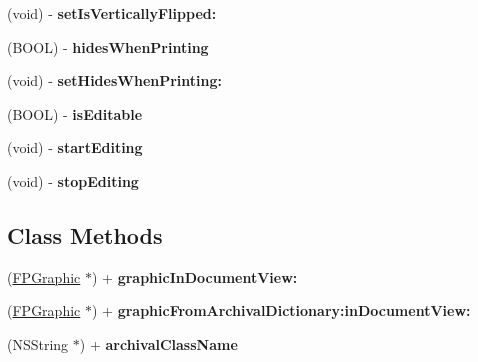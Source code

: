 \begin{DoxyCompactItemize}
(void) -\/ {\bfseries set\+Is\+Vertically\+Flipped\+:}
\item 
\mbox{\label{interface_f_p_graphic_a4898d86b37bb533fb8aac374c2e73dce}} 
(B\+O\+OL) -\/ {\bfseries hides\+When\+Printing}
\item 
\mbox{\label{interface_f_p_graphic_a8759b7bf35008b903003a63e1313969a}} 
(void) -\/ {\bfseries set\+Hides\+When\+Printing\+:}
\item 
\mbox{\label{interface_f_p_graphic_ab1b4e0d79e895be378550e712bc78a33}} 
(B\+O\+OL) -\/ {\bfseries is\+Editable}
\item 
\mbox{\label{interface_f_p_graphic_a82be1dce82ba693bcd3060450c033a0b}} 
(void) -\/ {\bfseries start\+Editing}
\item 
\mbox{\label{interface_f_p_graphic_a49d581d14a8dc848dcd489e93501debb}} 
(void) -\/ {\bfseries stop\+Editing}
\end{DoxyCompactItemize}
\subsection*{Class Methods}
\begin{DoxyCompactItemize}
\item 
\mbox{\label{interface_f_p_graphic_ac75de5a01d490f056fa52ee47eb2bbb0}} 
(\mbox{\hyperlink{interface_f_p_graphic}{F\+P\+Graphic}} $\ast$) + {\bfseries graphic\+In\+Document\+View\+:}
\item 
\mbox{\label{interface_f_p_graphic_a76cfd956ce13caf8f32cafbd166ece29}} 
(\mbox{\hyperlink{interface_f_p_graphic}{F\+P\+Graphic}} $\ast$) + {\bfseries graphic\+From\+Archival\+Dictionary\+:in\+Document\+View\+:}
\item 
\mbox{\label{interface_f_p_graphic_a1d5c0ba5ac96c513ae2b6e7183f21620}} 
(N\+S\+String $\ast$) + {\bfseries archival\+Class\+Name}
\end{DoxyCompactItemize}
